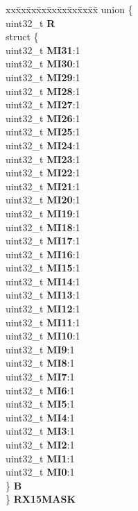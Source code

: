 \begin{DoxyCompactItemize}
\begin{tabbing}
\end{tabbing}\item 
\mbox{\label{structFLEXCAN2__tag_afd34125c40dc902a03814c3030baa97e}} 
\begin{tabbing}
xx\=xx\=xx\=xx\=xx\=xx\=xx\=xx\=xx\=\kill
union \{\\
\>uint32\_t {\bfseries R}\\
\>struct \{\\
\>\>uint32\_t {\bfseries MI31}:1\\
\>\>uint32\_t {\bfseries MI30}:1\\
\>\>uint32\_t {\bfseries MI29}:1\\
\>\>uint32\_t {\bfseries MI28}:1\\
\>\>uint32\_t {\bfseries MI27}:1\\
\>\>uint32\_t {\bfseries MI26}:1\\
\>\>uint32\_t {\bfseries MI25}:1\\
\>\>uint32\_t {\bfseries MI24}:1\\
\>\>uint32\_t {\bfseries MI23}:1\\
\>\>uint32\_t {\bfseries MI22}:1\\
\>\>uint32\_t {\bfseries MI21}:1\\
\>\>uint32\_t {\bfseries MI20}:1\\
\>\>uint32\_t {\bfseries MI19}:1\\
\>\>uint32\_t {\bfseries MI18}:1\\
\>\>uint32\_t {\bfseries MI17}:1\\
\>\>uint32\_t {\bfseries MI16}:1\\
\>\>uint32\_t {\bfseries MI15}:1\\
\>\>uint32\_t {\bfseries MI14}:1\\
\>\>uint32\_t {\bfseries MI13}:1\\
\>\>uint32\_t {\bfseries MI12}:1\\
\>\>uint32\_t {\bfseries MI11}:1\\
\>\>uint32\_t {\bfseries MI10}:1\\
\>\>uint32\_t {\bfseries MI9}:1\\
\>\>uint32\_t {\bfseries MI8}:1\\
\>\>uint32\_t {\bfseries MI7}:1\\
\>\>uint32\_t {\bfseries MI6}:1\\
\>\>uint32\_t {\bfseries MI5}:1\\
\>\>uint32\_t {\bfseries MI4}:1\\
\>\>uint32\_t {\bfseries MI3}:1\\
\>\>uint32\_t {\bfseries MI2}:1\\
\>\>uint32\_t {\bfseries MI1}:1\\
\>\>uint32\_t {\bfseries MI0}:1\\
\>\} {\bfseries B}\\
\} {\bfseries RX15MASK}\\


\end{tabbing}
\end{DoxyCompactItemize}
